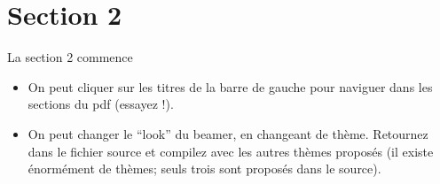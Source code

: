 \documentclass[french]{beamer}
\begin{document}
\section{Section 2}
\begin{frame}{La section 2 commence}
\begin{itemize}
	\item<1-> On peut cliquer sur les titres de la barre de gauche pour naviguer dans les sections du pdf (essayez !).
	\item<2-> On peut changer le ``look'' du beamer, en changeant de thème. Retournez dans le fichier source et compilez avec les autres thèmes proposés (il existe énormément de thèmes; seuls trois sont proposés dans le source).
\end{itemize}

\end{frame}
\end{document}
